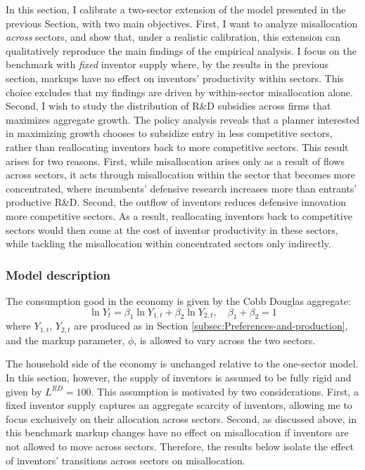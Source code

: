 In this section, I calibrate a two-sector extension of the model presented
in the previous Section, with two main objectives. First, I want to
analyze misallocation \emph{across }sectors, and show that, under
a realistic calibration, this extension can qualitatively reproduce
the main findings of the empirical analysis. I focus on the benchmark
with\emph{ fixed} inventor supply where, by the results in the previous
section, markups have no effect on inventors' productivity within
sectors. This choice excludes that my findings are driven by within-sector
misallocation alone. Second, I wish to study the distribution of R\&D
subsidies across firms that maximizes aggregate growth. The policy
analysis reveals that a planner interested in maximizing growth chooses
to subsidize entry in less competitive sectors, rather than reallocating
inventors back to more competitive sectors. This result arises for
two reasons. First, while misallocation arises only as a result of
flows across sectors, it acts through misallocation within the sector
that becomes more concentrated, where incumbents' defensive research
increases more than entrants' productive R\&D. Second, the outflow
of inventors reduces defensive innovation more competitive sectors.
As a result, reallocating inventors back to competitive sectors would
then come at the cost of inventor productivity in these sectors, while
tackling the misallocation within concentrated sectors only indirectly.

\subsubsection{Model description}

The consumption good in the economy is given by the Cobb Douglas aggregate:
\[
\ln Y_{t}=\beta_{1}\ln Y_{1,t}+\beta_{2}\ln Y_{2,t},\quad\beta_{1}+\beta_{2}=1
\]
where $Y_{1,t}$, $Y_{2,t}$ are produced as in Section \ref{subsec:Preferences-and-production},
and the markup parameter, $\phi$, is allowed to vary across the two
sectors.

The household side of the economy is unchanged relative to the one-sector
model. In this section, however, the supply of inventors is assumed
to be fully rigid and given by $L^{RD}=100.$ This assumption is motivated
by two considerations. First, a fixed inventor supply captures an
aggregate scarcity of inventors, allowing me to focus exclusively
on their allocation across sectors. Second, as discussed above, in
this benchmark markup changes have no effect on misallocation if inventors
are not allowed to move across sectors. Therefore, the results below
isolate the effect of inventors' transitions across sectors on misallocation.

